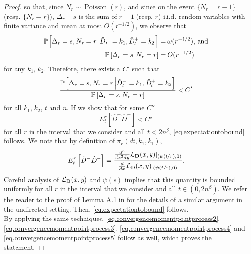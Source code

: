 \begin{proof}
so that, since $N_r\sim \operatorname{Poisson}(r)$, and since on the event $\{N_r=r-1\}$ (resp. $\{N_r=r\}$),  $\Delta_r-s$ is the sum of $r-1$ (resp. $r$) i.i.d. random variables with finite variance and mean at most $O(r^{-1/2})$, we observe that 
\begin{align*}
    \P\left[ \Delta_r=s, N_r=r \left| \hat{D}^-_t=k_1,\hat{D}^+_t=k_2\right.\right]&=\omega(r^{-1/2})\text{, and}\\
    \P\left[ \Delta_r=s, N_r=r \right]&=O(r^{-1/2})
\end{align*} for any $k_1$, $k_2$. Therefore, there exists a $C'$ such that
$$\frac{\P\left[ \Delta_r=s, N_r=r \left| \hat{D}^-_t=k_1,\hat{D}^+_t=k_2\right.\right]}{\P\left[ \Delta_r=s, N_r=r\right]}<C'$$
for all $k_1$, $k_2$, $t$ and $n$. If we show that for some $C''$ $${E}^r_t\left[\hat{D}^-\hat{D}^+\right]<C''$$ for all $r$ in the interval that we consider and all $t<2n^\beta$,  \eqref{eq.expectationtobound} follows. We note that by definition of $\pi_r(dt,k_1,k_1)$, 
$${E}^r_t\left[\hat{D}^-\hat{D}^+\right]=\frac{\frac{d^3}{dx^2 dy}\cL_{\mathbf{D}}(x,y)|_{(\psi(t/r),0)}}{\frac{d}{dx}\cL_{\mathbf{D}}(x,y)|_{(\psi(t/r),0)}}.$$
Careful analysis of $\cL_{\mathbf{D}}(x,y)$ and $\psi(s)$ implies that this quantity is bounded uniformly for all $r$ in the interval that we consider and all $t\in(0,2n^\beta)$. We refer the reader to the proof of Lemma A.1 in \cite{josephComponentSizesCritical2014} for the details of a similar argument in the undirected setting. Then, \eqref{eq.expectationtobound} follows. \\
By applying the same techniques, \eqref{eq.convergencemomentpointprocess2}, \eqref{eq.convergencemomentpointprocess3}, \eqref{eq.convergencemomentpointprocess4} and  \eqref{eq.convergencemomentpointprocess5} follow as well, which proves the statement.\end{proof}


